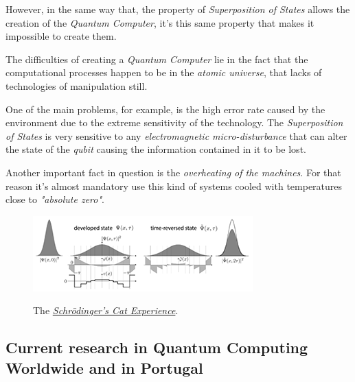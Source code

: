 \documentclass[conference]{IEEEtran}
\begin{document}
\vspace{4pt}

However, in the same way that, the property of \textit{Superposition of States} allows the creation of the \textit{Quantum Computer}, it's this same property that makes it impossible to create them.

\vspace{4pt}

The difficulties of creating a \textit{Quantum Computer} lie in the fact that the computational processes happen to be in the \textit{atomic universe}, that lacks of technologies of manipulation still.

\vspace{4pt}

One of the main problems, for example, is the high error rate caused by the environment due to the extreme sensitivity of the technology. The \textit{Superposition of States} is very sensitive to any \textit{electromagnetic micro-disturbance} that can alter the state of the \textit{qubit} causing the information contained in it to be lost.

\vspace{4pt}

Another important fact in question is the \textit{overheating of the machines}. For that reason it's almost mandatory use this kind of systems cooled with temperatures close to \textit{"absolute zero"}.

\vspace{4pt}

\begin{center}
  \begin{figure}[htbp]
    \centerline{\href{https://en.wikipedia.org/wiki/Schr\%C3\%B6dinger\%27s_cat}{\includegraphics{imgs/fig-1.png}}}
    \caption{The \href{https://en.wikipedia.org/wiki/Schr\%C3\%B6dinger\%27s_cat}{\textit{Schr\"odinger's Cat Experience}}.}
    \label{fig}
  \end{figure}
\end{center}

\subsection{Current research in Quantum Computing Worldwide and in Portugal}\label{AA}
\end{document}
